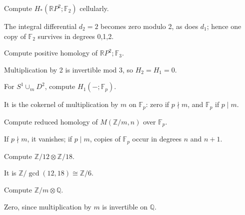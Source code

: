 \begin{problem}[RP2 mod 2]\label{prob:viii25-01}
Compute \(H_*(\mathbb RP^2;\mathbb F_2)\) cellularly.
\end{problem}
\begin{solution}
The integral differential \(d_2=2\) becomes zero modulo 2, as does \(d_1\); hence one copy of \(\mathbb F_2\) survives in degrees 0,1,2.
\end{solution}

\begin{problem}[RP2 mod 3]\label{prob:viii25-02}
Compute positive homology of \(\mathbb RP^2;\mathbb F_3\).
\end{problem}
\begin{solution}
Multiplication by 2 is invertible mod 3, so \(H_2=H_1=0\).
\end{solution}

\begin{problem}\label{prob:viii25-03}
For \(S^1\cup_mD^2\), compute \(H_1(-;\mathbb F_p)\).
\end{problem}
\begin{solution}
It is the cokernel of multiplication by \(m\) on \(\mathbb F_p\): zero if \(p\nmid m\), and \(\mathbb F_p\) if \(p\mid m\).
\end{solution}

\begin{problem}\label{prob:viii25-04}
Compute reduced homology of \(M(\mathbb Z/m,n)\) over \(\mathbb F_p\).
\end{problem}
\begin{solution}
If \(p\nmid m\), it vanishes; if \(p\mid m\), copies of \(\mathbb F_p\) occur in degrees \(n\) and \(n+1\).
\end{solution}

\begin{problem}\label{prob:viii25-05}
Compute \(\mathbb Z/12\otimes\mathbb Z/18\).
\end{problem}
\begin{solution}
It is \(\mathbb Z/\gcd(12,18)\cong\mathbb Z/6\).
\end{solution}

\begin{problem}\label{prob:viii25-06}
Compute \(\mathbb Z/m\otimes\mathbb Q\).
\end{problem}
\begin{solution}
Zero, since multiplication by \(m\) is invertible on \(\mathbb Q\).
\end{solution}

